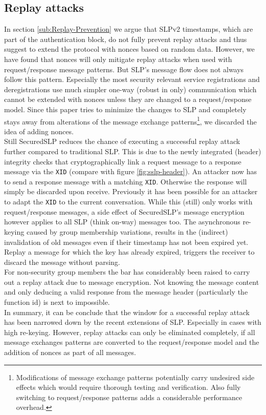 \subsection{Replay attacks}
In section \ref{sub:Replay-Prevention} we argue that SLPv2 timestamps, which are part of the authentication block, do not fully prevent replay attacks and thus suggest to extend the protocol with nonces based on random data. However, we have found that nonces will only mitigate replay attacks when used with request/response message patterns. But SLP's message flow does not always follow this pattern. Especially the most security relevant service registrations and deregistrations use much simpler one-way (robust in only) communication which cannot be extended with nonces unless they are changed to a request/response model. Since this paper tries to minimize the changes to SLP and completely stays away from alterations of the message exchange patterns\footnote{Modifications of message exchange patterns potentially carry undesired side effects which would require thorough testing and verification. Also fully switching to request/response patterns adds a considerable performance overhead.}, we discarded the idea of adding nonces.\\
Still SecuredSLP reduces the chance of executing a successful replay attack further compared to traditional SLP. This is due to the newly integrated (header) integrity checks that cryptographically link a request message to a response message via the \texttt{XID} (compare with figure \ref{fig:sslp-header}). An attacker now has to send a response message with a matching \texttt{XID}. Otherwise the response will simply be discarded upon receive. Previously it has been possible for an attacker to adapt the \texttt{XID} to the current conversation.  While this (still) only works with request/response messages, a side effect of SecuredSLP's message encryption however applies to all SLP (think on-way) messages too. The asynchronous re-keying caused by group membership variations, results in the (indirect) invalidation of old messages even if their timestamp has not been expired yet. Replay a message for which the key has already expired, triggers the receiver to discard the message without parsing.\\
For non-security group members the bar has considerably been raised to carry out a replay attack due to message encryption. Not knowing the message content and only deducing a valid response from the message header (particularly the function id) is next to impossible.\\
In summary, it can be conclude that the window for a successful replay attack has been narrowed down by the recent extensions of SLP. Especially in cases with high re-keying. However, replay attacks can only be eliminated completely, if all message exchanges patterns are converted to the request/response model and the addition of nonces as part of all messages.

